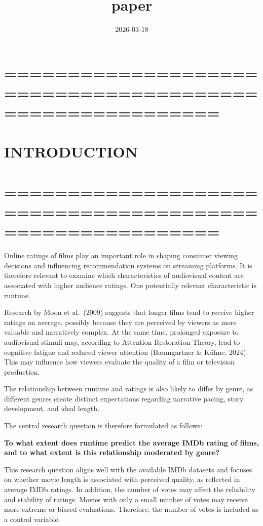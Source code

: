 \documentclass[
]{article}
\title{paper}
\author{}
\date{\vspace{-2.5em}2026-03-18}
\begin{document}
\maketitle

\section{=========================================================}\label{section}

\section{INTRODUCTION}\label{introduction}

\section{=========================================================}\label{section-1}

Online ratings of films play an important role in shaping consumer
viewing decisions and influencing recommendation systems on streaming
platforms. It is therefore relevant to examine which characteristics of
audiovisual content are associated with higher audience ratings. One
potentially relevant characteristic is runtime.

Research by Moon et al.~(2009) suggests that longer films tend to
receive higher ratings on average, possibly because they are perceived
by viewers as more valuable and narratively complex. At the same time,
prolonged exposure to audiovisual stimuli may, according to Attention
Restoration Theory, lead to cognitive fatigue and reduced viewer
attention (Baumgartner \& Kühne, 2024). This may influence how viewers
evaluate the quality of a film or television production.

The relationship between runtime and ratings is also likely to differ by
genre, as different genres create distinct expectations regarding
narrative pacing, story development, and ideal length.

The central research question is therefore formulated as follows:

\textbf{To what extent does runtime predict the average IMDb rating of
films, and to what extent is this relationship moderated by genre?}

This research question aligns well with the available IMDb datasets and
focuses on whether movie length is associated with perceived quality, as
reflected in average IMDb ratings. In addition, the number of votes may
affect the reliability and stability of ratings. Movies with only a
small number of votes may receive more extreme or biased evaluations.
Therefore, the number of votes is included as a control variable.
\end{document}
